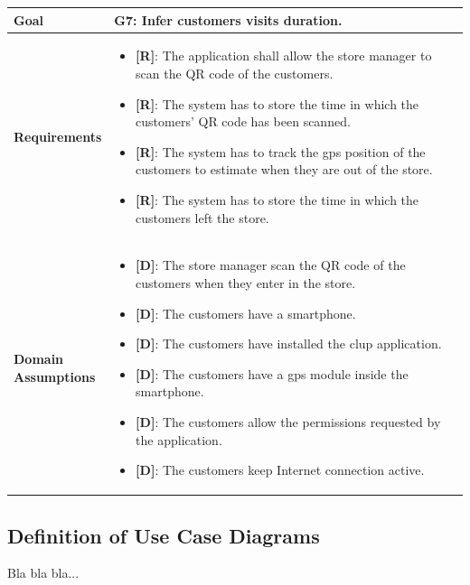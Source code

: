 \begin{table}[H]
\centering
\begin{tabular}{| m{} | m{} |} 
	\hline
	\textbf{Goal} &
		\textbf{G7: Infer customers visits duration.} \\
	\hline
	\textbf{Requirements} &
		\begin{itemize}
			\item {\textbf{[R]}}: The application shall allow the store manager to scan the QR code of the customers.
			\item {\textbf{[R]}}: The system has to store the time in which the customers' QR code has been scanned.
			\item {\textbf{[R]}}: The system has to track the \gls{gps} position of the customers to estimate when they are out of the store.
			\item {\textbf{[R]}}: The system has to store the time in which the customers left the store.
		\end{itemize} \\ 
	\hline
	\shortstack[l]{\textbf{Domain} \\ \textbf{Assumptions}} & 
		\begin{itemize}
			\item {\textbf{[D]}}: The store manager scan the QR code of the customers when they enter in the store.
			\item {\textbf{[D]}}: The customers have a smartphone.
			\item {\textbf{[D]}}: The customers have installed the \gls{clup} application.
			\item {\textbf{[D]}}: The customers have a \gls{gps} module inside the smartphone.
			\item {\textbf{[D]}}: The customers allow the permissions requested by the application.
			\item {\textbf{[D]}}: The customers keep Internet connection active.
		\end{itemize} \\ 
	\hline
\end{tabular}
\end{table}


\subsection{Definition of Use Case Diagrams}

Bla bla bla...

